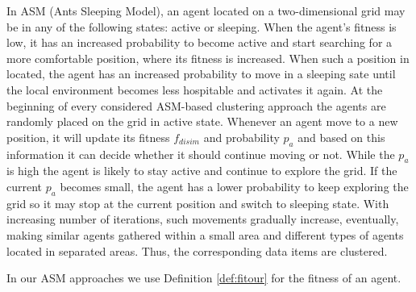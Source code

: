 In ASM (Ants Sleeping Model), an agent located on a two-dimensional grid may be in any of the following states: active or sleeping. When the agent's fitness is low, it has an increased probability to become  active and start searching for a more comfortable position, where its fitness is increased. When such a position in located, the agent has an  increased probability to move in a sleeping sate until the local environment becomes less hospitable and activates it again.
At the beginning of every considered ASM-based clustering approach the agents are randomly placed on the grid in active state. Whenever an agent move to a new position, it will update its fitness $f_{disim}$ and probability $p_a$ and based on this information it can decide whether it should continue moving or not. While the $p_{a}$ is high the agent is likely to stay active and continue to explore the grid. If the current $p_{a}$ becomes small, the agent has a lower probability to keep exploring the grid so it may stop at the current position and switch to sleeping state. With increasing number of iterations, such movements gradually increase, eventually, making similar agents gathered within a small area and different types of agents located in separated areas. Thus, the corresponding data items are clustered. 

In our ASM approaches we use Definition \ref{def:fitour} for the fitness of an agent.

